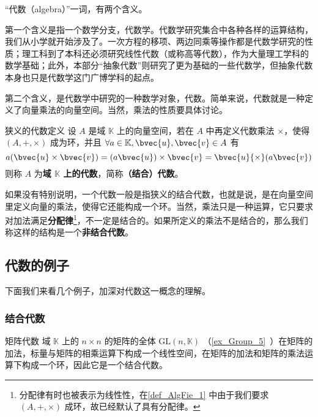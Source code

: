 

“代数（algebra）”一词，有两个含义。

第一个含义是指一个数学分支，代数学。代数学研究集合中各种各样的运算结构，我们从小学就开始涉及了。一次方程的移项、两边同乘等操作都是代数学研究的性质；理工科到了本科还必须研究线性代数（或称高等代数），作为大量理工学科的数学基础；此外，本部分“抽象代数”则研究了更为基础的一些代数学，但抽象代数本身也只是代数学这门广博学科的起点。

第二个含义，是代数学中研究的一种数学对象，代数。简单来说，代数就是一种定义了向量乘法的向量空间。当然，乘法的性质要具体讨论。



\begin{definition}{狭义的代数定义}\label{def_AlgFie_1}
设 $A$ 是域 $\mathbb{K}$ 上的向量空间，若在 $A$ 中再定义代数乘法 $\times$，使得 $(A,+,\times)$ 成为环，并且 $\forall a\in \mathbb{K}, \bvec{u}, \bvec{v}\in A$ 有
\begin{equation}
a(\bvec{u} \times \bvec{v})=(a \bvec{u}) \times \bvec{v}=\bvec{u}{\times}(a \bvec{v})
\end{equation}
则称 $A$ 为\textbf{域 $\mathbb{K}$ 上的代数}，简称\textbf{（结合）代数}。

\end{definition}

如果没有特别说明，一个代数一般是指狭义的结合代数，也就是说，是在向量空间里定义向量的乘法，使得它还能构成一个环。当然，乘法只是一种运算，它只要求对加法满足\textbf{分配律}\footnote{分配律有时也被表示为线性性，在\autoref{def_AlgFie_1} 中由于我们要求 $(A, +, \times)$ 成环，故已经默认了具有分配律。}，不一定是结合的。如果所定义的乘法不是结合的，那么我们称这样的结构是一个\textbf{非结合代数}。


\subsection{代数的例子}
下面我们来看几个例子，加深对代数这一概念的理解。

\subsubsection{结合代数}

\begin{example}{矩阵代数}
域 $\mathbb{K}$ 上的 $n\times n$ 的矩阵的全体 $\mathrm{GL}(n, \mathbb{K})$ （\autoref{ex_Group_5}~）在矩阵的加法，标量与矩阵的相乘运算下构成一个线性空间，在矩阵的加法和矩阵的乘法运算下构成一个环，因此它是一个结合代数。
\end{example}

